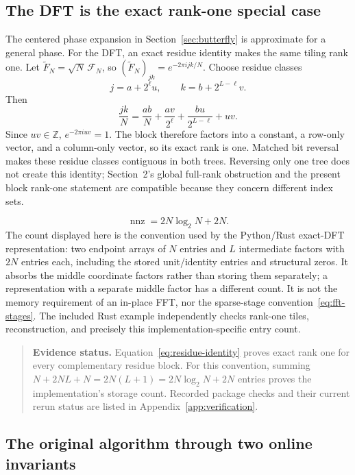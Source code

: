\documentclass[11pt,a4paper]{article}
\newcommand{\nnz}{\operatorname{nnz}}
\newenvironment{evidence}{\begin{quote}\small\color{muted}\textbf{Evidence status.} }{\end{quote}}
\begin{document}
\subsection{The DFT is the exact rank-one special case}
The centered phase expansion in Section~\ref{sec:butterfly} is approximate for a general phase. For the DFT, an exact residue identity makes the same tiling rank one. Let $\widetilde F_N=\sqrt N\,\mathcal F_N$, so $(\widetilde F_N)_{jk}=e^{-2\pi ijk/N}$. Choose residue classes
\[
 j=a+2^\ell u,\qquad k=b+2^{L-\ell}v.
\]
Then
\begin{equation}
 \frac{jk}{N}=\frac{ab}{N}+\frac{av}{2^\ell}
 +\frac{bu}{2^{L-\ell}}+uv .
 \label{eq:residue-identity}
\end{equation}
Since $uv\in\mathbb Z$, $e^{-2\pi iuv}=1$. The block therefore factors into a constant, a row-only vector, and a column-only vector, so its exact rank is one. Matched bit reversal makes these residue classes contiguous in both trees. Reversing only one tree does not create this identity; Section~2's global full-rank obstruction and the present block rank-one statement are compatible because they concern different index sets.

\begin{equation}
 \nnz=2N\log_2N+2N .
 \label{eq:fftcount}
\end{equation}
The count displayed here is the convention used by the Python/Rust exact-DFT representation: two endpoint arrays of $N$ entries and $L$ intermediate factors with $2N$ entries each, including the stored unit/identity entries and structural zeros. It absorbs the middle coordinate factors rather than storing them separately; a representation with a separate middle factor has a different count. It is not the memory requirement of an in-place FFT, nor the sparse-stage convention~\eqref{eq:fft-stages}. The included Rust example independently checks rank-one tiles, reconstruction, and precisely this implementation-specific entry count.
\begin{evidence}
Equation~\eqref{eq:residue-identity} proves exact rank one for every complementary residue block. For this convention, summing $N+2NL+N=2N(L+1)=2N\log_2N+2N$ entries proves the implementation's storage count. Recorded package checks and their current rerun status are listed in Appendix~\ref{app:verification}.
\end{evidence}

\subsection{The original algorithm through two online invariants}
\label{sec:two-invariants}
\end{document}
